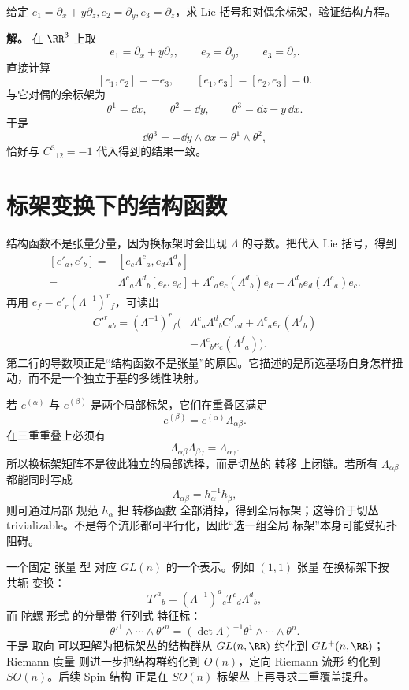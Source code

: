 \begin{exbox}[一个简单的非坐标标架]
给定 $e_1=\partial_x+y\partial_z,e_2=\partial_y,e_3=\partial_z$，求 Lie 括号和对偶余标架，验证结构方程。

\textbf{解。} 在 $\RR^3$ 上取
\[
e_1=\partial_x+y\partial_z,
\qquad
e_2=\partial_y,
\qquad
e_3=\partial_z.
\]
直接计算
\[
[e_1,e_2]=-e_3,
\qquad
[e_1,e_3]=[e_2,e_3]=0.
\]
与它对偶的余标架为
\[
\theta^1=\dd x,
\qquad
\theta^2=\dd y,
\qquad
\theta^3=\dd z-y\,\dd x.
\]
于是
\[
\dd\theta^3
=-\dd y\wedge\dd x
=\theta^1\wedge\theta^2,
\]
恰好与 $C^3{}_{12}=-1$ 代入得到的结果一致。
\end{exbox}

\section{标架变换下的结构函数}
结构函数不是张量分量，因为换标架时会出现 $\Lambda$ 的导数。把代入 Lie 括号，得到
\[
\begin{aligned}
[e'_a,e'_b]
={}&[e_c\Lambda^c{}_a,e_d\Lambda^d{}_b]\\
={}&\Lambda^c{}_a\Lambda^d{}_b[e_c,e_d]
+\Lambda^c{}_a e_c(\Lambda^d{}_b)e_d
-\Lambda^d{}_b e_d(\Lambda^c{}_a)e_c.
\end{aligned}
\]
再用 $e_f=e'_r(\Lambda^{-1})^r{}_f$，可读出
\begin{align*}
C'^r{}_{ab}
=(\Lambda^{-1})^r{}_f\bigl(&\Lambda^c{}_a\Lambda^d{}_b C^f{}_{cd}
+\Lambda^c{}_a e_c(\Lambda^f{}_b)\\
&-\Lambda^c{}_b e_c(\Lambda^f{}_a)\bigr).
\end{align*}
第二行的导数项正是“结构函数不是张量”的原因。它描述的是所选基场自身怎样扭动，而不是一个独立于基的多线性映射。

若 $e^{(\alpha)}$ 与 $e^{(\beta)}$ 是两个局部标架，它们在重叠区满足
\[
e^{(\beta)}=e^{(\alpha)}\Lambda_{\alpha\beta}.
\]
在三重重叠上必须有
\begin{equation*}\Lambda_{\alpha\beta}\Lambda_{\beta\gamma}
=\Lambda_{\alpha\gamma}.\end{equation*}
所以换标架矩阵不是彼此独立的局部选择，而是切丛的 转移 上闭链。若所有 $\Lambda_{\alpha\beta}$ 都能同时写成
\[
\Lambda_{\alpha\beta}=h_\alpha^{-1}h_\beta,
\]
则可通过局部 规范 $h_\alpha$ 把 转移函数 全部消掉，得到全局标架；这等价于切丛 trivializable。不是每个流形都可平行化，因此“选一组全局 标架”本身可能受拓扑阻碍。

一个固定 张量 型 对应 $GL(n)$ 的一个表示。例如 $(1,1)$ 张量 在换标架下按 共轭 变换：
\[
T'^a{}_b
=(\Lambda^{-1})^a{}_cT^c{}_d\Lambda^d{}_b,
\]
而 陀螺 形式 的分量带 行列式 特征标：
\[
\theta'^1\wedge\cdots\wedge\theta'^n
=(\det\Lambda)^{-1}
\theta^1\wedge\cdots\wedge\theta^n.
\]
于是 取向 可以理解为把标架丛的结构群从 $GL(n,\RR)$ 约化到 $GL^+(n,\RR)$；Riemann 度量 则进一步把结构群约化到 $O(n)$，定向 Riemann 流形 约化到 $SO(n)$。后续 Spin 结构 正是在 $SO(n)$ 标架丛 上再寻求二重覆盖提升。

